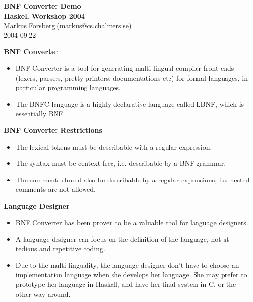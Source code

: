 \documentclass{seminar}
\newcommand{\slideheading}[1]{\begin{center}\large\bf{#1}\end{center}\bigskip}
\begin{document}
\begin{slide}
  
  \begin{center} 
    {\large \bf BNF Converter Demo \\ 
      \vspace*{0.5cm} 
      Haskell Workshop 2004\\}
    {\normalsize
      \vspace*{1.5cm}
      Markus Forsberg (markus@cs.chalmers.se)\\
      2004-09-22}
  \end{center}
\end{slide}

\begin{slide}
  \slideheading{BNF Converter}
  \begin{itemize}
  \item BNF Converter is a tool for generating multi-lingual 
    compiler front-ends 
    (lexers, parsers, pretty-printers, documentations etc) for 
    formal languages, in particular programming languages.
  \item The BNFC language is a highly declarative language called
    LBNF, which is essentially BNF.
  \end{itemize}
\end{slide}

\begin{slide}
  \slideheading{BNF Converter Restrictions}
  \begin{itemize}
  \item The lexical tokens must be describable with a regular
  expression.
  \item The syntax must be context-free, i.e. describable by a 
    BNF grammar.
  \item The comments should also be describable by a regular
  expressions, i.e. nested comments are not allowed.
  \end{itemize}
\end{slide}


\begin{slide}
  \slideheading{Language Designer}
  \begin{itemize}
  \item BNF Converter has been proven to be a valuable tool for
    language designers.
  \item A language designer can focus on the definition of the language, not at tedious
    and repetitive coding. 
  \item Due to the multi-linguality, the language designer 
    don't have to choose an
    implementation language when she develops her language. She may
    prefer to prototype her language in Haskell, and have her final
    system in C, or the other way around.
  \end{itemize}
\end{slide}
\end{document}
